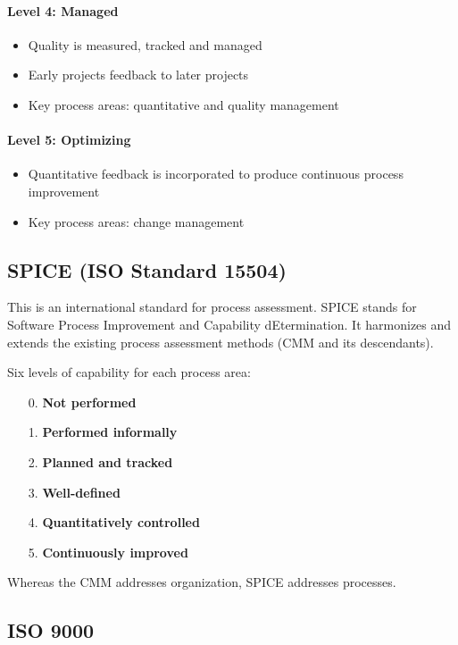 \paragraph{Level 4: Managed}
\begin{itemize}
    \item Quality is measured, tracked and managed
    \item Early projects feedback to later projects
    \item Key process areas: quantitative and quality management
\end{itemize}

\paragraph{Level 5: Optimizing}
\begin{itemize}
    \item Quantitative feedback is incorporated to produce continuous process improvement
    \item Key process areas: change management
\end{itemize}

\subsection{SPICE (ISO Standard 15504)}

This is an international standard for process assessment. SPICE stands for
Software Process Improvement and Capability dEtermination. It harmonizes and extends the existing process assessment methods (CMM and its
descendants).\newline

Six levels of capability for each process area:
\begin{itemize}
    \item[0.] \textbf{Not performed}
    \item[1.] \textbf{Performed informally}
    \item[2.] \textbf{Planned and tracked}
    \item[3.] \textbf{Well-defined}
    \item[4.] \textbf{Quantitatively controlled}
    \item[5.] \textbf{Continuously improved}
\end{itemize}

Whereas the CMM addresses organization, SPICE addresses processes.

\subsection{ISO 9000}

